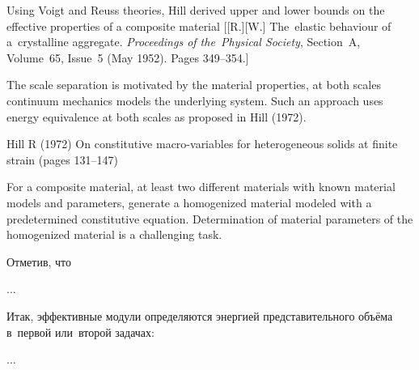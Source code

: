 

\begin{otherlanguage}{russian}

{\small
\noindent
Using Voigt and Reuss theories, Hill derived upper and lower bounds on the effective properties of a composite material [[R.][W.] The~elastic behaviour of a~crystalline aggregate. \emph{Proceedings of the~Physical Society}, Section~A, Volume~65, Issue~5 (May 1952). Pages 349\hbox{--}354.]

The scale separation is motivated by the material properties, at both scales continuum mechanics models the underlying system.
Such an approach uses energy equivalence at both scales as proposed in Hill (1972).

Hill R (1972) On constitutive macro-variables for heterogeneous solids at finite strain (pages 131–147)

For a composite material, at least two different materials with known material models and parameters, generate a homogenized material modeled with a predetermined constitutive equation. Determination of material parameters of the homogenized material is a challenging task.
\par}

Отметив, что

...



\end{otherlanguage}



\begin{otherlanguage}{russian}

Итак, эффективные модули определяются энергией представительного объёма в~первой или~второй задачах:

...



\end{otherlanguage}

